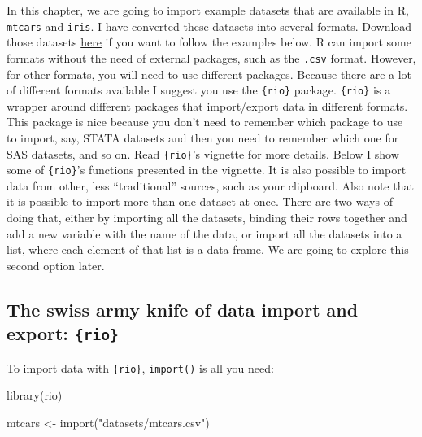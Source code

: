 \documentclass[
]{article}
\newenvironment{Shaded}{\begin{snugshade}}{\end{snugshade}}
\newcommand{\FunctionTok}[1]{\textcolor[rgb]{0.00,0.00,0.00}{#1}}
\newcommand{\NormalTok}[1]{#1}
\newcommand{\OtherTok}[1]{\textcolor[rgb]{0.56,0.35,0.01}{#1}}
\newcommand{\StringTok}[1]{\textcolor[rgb]{0.31,0.60,0.02}{#1}}
\begin{document}
In this chapter, we are going to import example datasets that are available in R, \texttt{mtcars} and
\texttt{iris}. I have converted these datasets into several formats. Download those datasets
\href{https://github.com/b-rodrigues/modern_R/tree/master/datasets}{here} if you want to follow the
examples below. R can import some formats without the need of external packages, such as the \texttt{.csv}
format. However, for other formats, you will need to use different packages. Because there are a
lot of different formats available I suggest you use the \texttt{\{rio\}} package.
\texttt{\{rio\}} is a wrapper around different packages that import/export data in different formats.
This package is nice because you don't need to remember which package to use to import, say,
STATA datasets and then you need to remember which one for SAS datasets, and so on. Read \texttt{\{rio\}}'s
\href{https://cran.r-project.org/web/packages/rio/vignettes/rio.html}{vignette} for more details. Below
I show some of \texttt{\{rio\}}'s functions presented in the vignette. It is also possible to import data from
other, less ``traditional'' sources, such as your clipboard. Also note that it is possible to import
more than one dataset at once. There are two ways of doing that, either by importing all the
datasets, binding their rows together and add a new variable with the name of the data, or import
all the datasets into a list, where each element of that list is a data frame. We are going to
explore this second option later.

\hypertarget{the-swiss-army-knife-of-data-import-and-export-rio}{%
\subsection{\texorpdfstring{The swiss army knife of data import and export: \texttt{\{rio\}}}{The swiss army knife of data import and export: \{rio\}}}\label{the-swiss-army-knife-of-data-import-and-export-rio}}

To import data with \texttt{\{rio\}}, \texttt{import()} is all you need:

\begin{Shaded}
\begin{Highlighting}[]
\FunctionTok{library}\NormalTok{(rio)}

\NormalTok{mtcars }\OtherTok{\textless{}{-}} \FunctionTok{import}\NormalTok{(}\StringTok{"datasets/mtcars.csv"}\NormalTok{)}
\end{Highlighting}
\end{Shaded}
\end{document}
